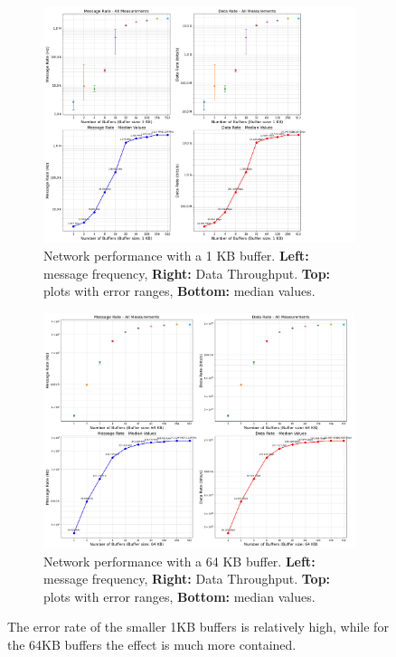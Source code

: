 \begin{figure}[htbp]
\centering
\begin{subfigure}[b]{0.7\textwidth}
    \centering
    \includegraphics[width=\textwidth]{images/results/libfabric_throughput_analysis_1K.png}
    \caption[Network performance with a 1 KB buffer]{Network performance with a 1 KB buffer. \textbf{Left:} message frequency, \textbf{Right:} Data Throughput. \textbf{Top:} plots with error ranges, \textbf{Bottom:} median values.}
    \label{fig:1kb-buffer-throughput}
\end{subfigure}
\vspace{0.2cm}
\begin{subfigure}[b]{0.7\textwidth}
    \centering
    \includegraphics[width=\textwidth]{images/results/libfabric_throughput_analysis_64K.png}
    \caption[Network performance with a 64 KB buffer]{Network performance with a 64 KB buffer. \textbf{Left:} message frequency, \textbf{Right:} Data Throughput. \textbf{Top:} plots with error ranges, \textbf{Bottom:} median values.}
    \label{fig:64kb-buffer-throughput}
\end{subfigure}
\caption[Throughput comparison of 1KB and 64KB buffer]{The error rate of the smaller 1KB buffers is relatively high, while for the 64KB buffers the effect is much more contained.}
\label{fig:throughput-of-the-extremes-1K-64K}
\end{figure}

